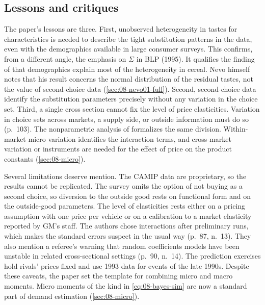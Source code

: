 \subsection{Lessons and critiques}\label{sec:08-blp04-lessons}

The paper's lessons are three. First, unobserved heterogeneity in tastes for characteristics is needed to
describe the tight substitution patterns in the data, even with the demographics available in large consumer
surveys. This confirms, from a different angle, the emphasis on $\Sigma$ in BLP (1995). It qualifies
the finding of \citet{Nevo2001} that demographics explain most of the heterogeneity in cereal. Nevo himself notes that
his result concerns the normal distribution of the residual tastes, not the value of second-choice data
(\cref{sec:08-nevo01-full}). Second, second-choice data identify the substitution parameters precisely without
any variation in the choice set. Third, a single cross section cannot fix the level of price elasticities.
Variation in choice sets across markets, a supply side, or outside information must do so (p.~103). The
nonparametric analysis of \citet{BerryHaile2024} formalizes the same division. Within-market micro variation
identifies the interaction terms, and cross-market variation or instruments are needed for the effect of price
on the product constants (\cref{sec:08-micro}).

Several limitations deserve mention. The CAMIP data are proprietary, so the results cannot be replicated. The
survey omits the option of not buying as a second choice, so diversion to the outside good rests on functional
form and on the outside-good parameters. The level of elasticities rests either on a pricing assumption with
one price per vehicle or on a calibration to a market elasticity reported by GM's staff. The authors chose
interactions after preliminary runs, which makes the standard errors suspect in the usual way (p.~87, n.~13).
They also mention a referee's warning that random coefficients models have been unstable in related
cross-sectional settings (p.~90, n.~14). The prediction exercises hold rivals' prices fixed and use 1993 data
for events of the late 1990s. Despite these caveats, the paper set the template for combining micro and macro
moments. Micro moments of the kind in \eqref{eq:08-bayes-sim} are now a standard part of demand estimation
(\cref{sec:08-micro}).

